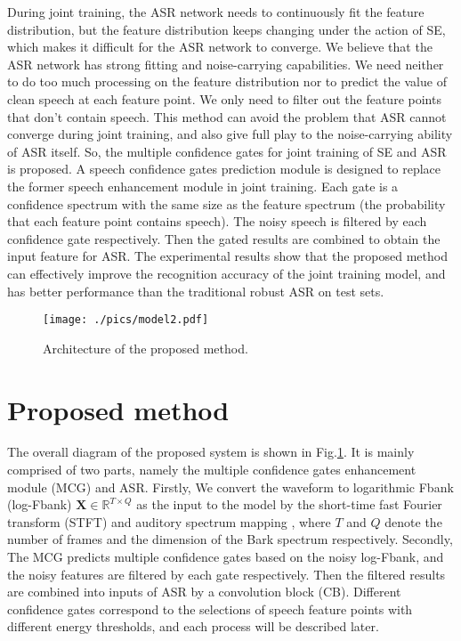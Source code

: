 \documentclass{article}
\begin{document}
	During joint training, the ASR network needs to continuously fit the feature distribution, but the feature distribution keeps changing under the action of SE, which makes it difficult for the ASR network to converge. We believe that the ASR network has strong fitting and noise-carrying capabilities. We need neither to do too much processing on the feature distribution nor to predict the value of clean speech at each feature point. We only need to filter out the feature points that don't contain speech. This method can avoid the problem that ASR cannot converge during joint training, and also give full play to the noise-carrying ability of ASR itself. So, the multiple confidence gates for joint training of SE and ASR is proposed. A speech confidence gates prediction module is designed to replace the former speech enhancement module in joint training. Each gate is a confidence spectrum with the same size as the feature spectrum (the probability that each feature point contains speech). The noisy speech is filtered by each confidence gate respectively. Then the gated results are combined to obtain the input feature for ASR. The experimental results show that the proposed method can effectively improve the recognition accuracy of the joint training model, and has better performance than the traditional robust ASR on test sets.
	

	\begin{figure}[htb]
		\centering
		\vspace{-0.7cm}
		\texttt{[image: ./pics/model2.pdf]}
		\vspace{-0.7cm}
		\caption{Architecture of the proposed method.}
		\label{allmodel}
		\vspace{-0.4cm}
	\end{figure}

	\section{Proposed method}
	The overall diagram of the proposed system is shown in Fig.\ref{allmodel}. It is mainly comprised of two parts, namely the multiple confidence gates enhancement module (MCG) and ASR. Firstly, We convert the waveform to logarithmic Fbank (log-Fbank)  $\bm{X} \in \mathbb{R}^{T\times Q}$ as the input to the model by the short-time fast Fourier transform (STFT) \cite{stft} and auditory spectrum mapping \cite{fbank}, where $T$ and $Q$ denote the number of frames and the dimension of the Bark spectrum respectively. Secondly, The MCG predicts multiple confidence gates based on the noisy log-Fbank, and the noisy features are filtered by each gate respectively. Then the filtered results are combined into inputs of ASR by a convolution block (CB). Different confidence gates correspond to the selections of speech feature points with different energy thresholds, and each process will be described later. 
	
\end{document}
